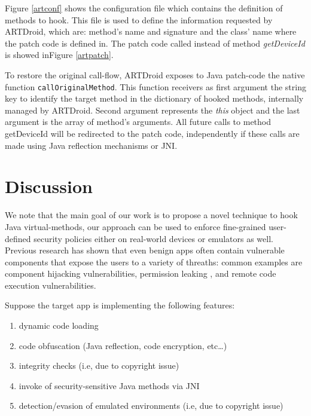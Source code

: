 Figure \ref{artconf} shows the configuration file which contains the definition of methods to hook. 
This file is used to define the information requested by ARTDroid, which are: method's name and signature and the class' name where the patch code is defined in. 
The patch code called instead of method \textit{getDeviceId} is showed inFigure \ref{artpatch}.


%

To restore the original call-flow, ARTDroid exposes to Java patch-code the native function {\tt callOriginalMethod}. This function receivers as first argument the string key to identify the target method in the dictionary of hooked methods, internally managed by ARTDroid. Second argument represents the \textit{this} object and the last argument is the array of method's arguments. All future calls to method getDeviceId will be redirected to the patch code, independently if these calls are made using Java reflection mechanisms or JNI.

\section{Discussion}
\label{sec:discuss}

We note that the main goal of our work is to  propose a novel technique to hook Java virtual-methods, our approach can be used to enforce fine-grained user-defined security policies either on real-world devices or emulators as well. Previous research has shown that even benign apps often contain vulnerable components that expose the users to a variety of threaths: common examples are component hijacking vulnerabilities\cite{lu2012chex}, permission leaking \cite{grace2012systematic},\cite{jiang2013detecting} and remote code execution vulnerabilities\cite{poeplau2014execute}.

Suppose the target app is implementing the following features:
\begin{enumerate}
\item \label{itm:first} dynamic code loading
\item\label{itm:second}  code obfuscation (Java reflection, code encryption, etc\ldots)
\item \label{itm:third} integrity checks (i.e, due to copyright issue)
\item \label{itm:fourth} invoke of security-sensitive Java methods via JNI
\item \label{itm:fifth} detection/evasion of emulated environments (i.e, due to copyright issue)
\end{enumerate}

